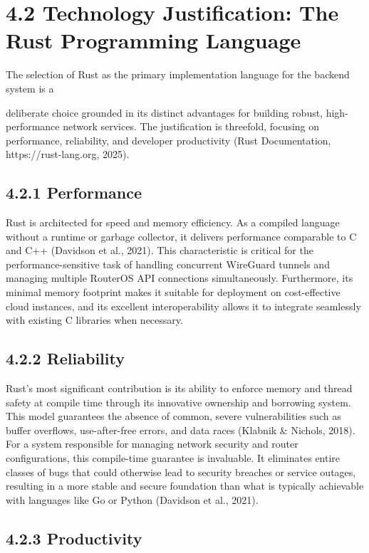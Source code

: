 \documentclass[12pt,a4paper,oneside]{report}
\begin{document}
\section{4.2 Technology Justification: The Rust Programming Language}

The selection of Rust as the primary implementation language for the backend system is a


deliberate choice grounded in its distinct advantages for building robust, high-performance network services. The justification is threefold, focusing on performance, reliability, and developer productivity (Rust Documentation, https://rust-lang.org, 2025).


\subsection{4.2.1 Performance}

Rust is architected for speed and memory efficiency. As a compiled language without a runtime or garbage collector, it delivers performance comparable to C and C++ (Davidson et al., 2021). This characteristic is critical for the performance-sensitive task of handling concurrent WireGuard tunnels and managing multiple RouterOS API connections simultaneously. Furthermore, its minimal memory footprint makes it suitable for deployment on cost-effective cloud instances, and its excellent interoperability allows it to integrate seamlessly with existing C libraries when necessary.


\subsection{4.2.2 Reliability}

Rust's most significant contribution is its ability to enforce memory and thread safety at compile time through its innovative ownership and borrowing system. This model guarantees the absence of common, severe vulnerabilities such as buffer overflows, use-after-free errors, and data races (Klabnik \& Nichols, 2018). For a system responsible for managing network security and router configurations, this compile-time guarantee is invaluable. It eliminates entire classes of bugs that could otherwise lead to security breaches or service outages, resulting in a more stable and secure foundation than what is typically achievable with languages like Go or Python (Davidson et al., 2021).




\subsection{4.2.3 Productivity}
\end{document}
